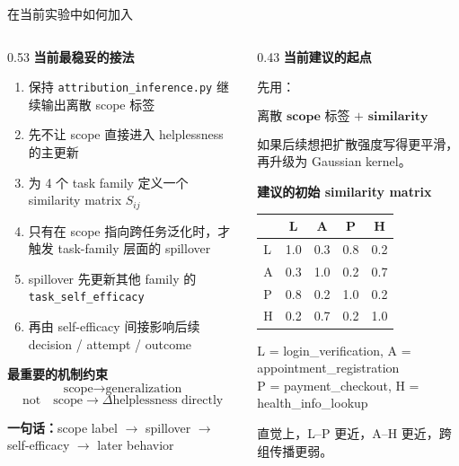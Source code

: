 \documentclass[aspectratio=169]{beamer}
\begin{document}
\begin{frame}[t]{在当前实验中如何加入}
\scriptsize
\begin{columns}[T]
\begin{column}{0.53\textwidth}
\textbf{当前最稳妥的接法}
\begin{enumerate}
    \item 保持 \texttt{attribution\_inference.py} 继续输出离散 scope 标签
    \item 先不让 scope 直接进入 helplessness 的主更新
    \item 为 4 个 task family 定义一个 similarity matrix \(S_{ij}\)
    \item 只有在 scope 指向跨任务泛化时，才触发 task-family 层面的 spillover
    \item spillover 先更新其他 family 的 \texttt{task\_self\_efficacy}
    \item 再由 self-efficacy 间接影响后续 decision / attempt / outcome
\end{enumerate}

\vspace{0.06cm}
\textbf{最重要的机制约束}
\[
\text{scope} \rightarrow \text{generalization}
\]
\[
\text{not} \quad \text{scope} \rightarrow \Delta \text{helplessness directly}
\]

\vspace{0.04cm}
\textbf{一句话：}scope label $\rightarrow$ spillover $\rightarrow$ self-efficacy $\rightarrow$ later behavior
\end{column}

\begin{column}{0.43\textwidth}
\textbf{当前建议的起点}

\vspace{0.02cm}
\raggedright
先用：

\[
\textbf{离散 scope 标签 + similarity matrix spillover}
\]

\vspace{0.02cm}
如果后续想把扩散强度写得更平滑，再升级为 Gaussian kernel。

\vspace{0.05cm}
\textbf{建议的初始 similarity matrix}

\vspace{0.08cm}
\centering
\begin{tabular}{lcccc}
\toprule
 & L & A & P & H \\
\midrule
L & 1.0 & 0.3 & 0.8 & 0.2 \\
A & 0.3 & 1.0 & 0.2 & 0.7 \\
P & 0.8 & 0.2 & 1.0 & 0.2 \\
H & 0.2 & 0.7 & 0.2 & 1.0 \\
\bottomrule
\end{tabular}

\vspace{0.1cm}
\raggedright
{\tiny
L = login\_verification, A = appointment\_registration\\
P = payment\_checkout, H = health\_info\_lookup
}

\vspace{0.05cm}
{\tiny
直觉上，L--P 更近，A--H 更近，跨组传播更弱。
}
\end{column}
\end{columns}
\end{frame}
\end{document}
